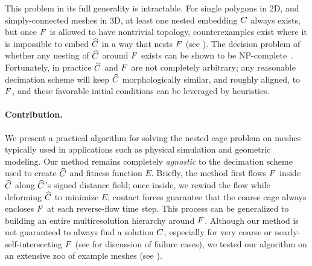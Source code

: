 This problem in its full generality is intractable. For
single polygons in 2D, and simply-connected meshes in 3D, at least one nested
embedding $C$ always exists, but once $F$ is allowed to have nontrivial
topology, counterexamples exist where it is impossible to embed $\widehat{C}$ in a way
that nests $F$ (see ). The decision
problem of whether any nesting of $\widehat{C}$ around $F$ exists can be 
shown to be NP-complete~\cite{CagesNP}.
Fortunately, in practice $\widehat{C}$ and $F$ are not completely arbitrary; any
reasonable decimation scheme will keep $\widehat{C}$ morphologically similar, and
roughly aligned, to $F$, and these favorable initial conditions can be
leveraged by heuristics.

\paragraph{Contribution.} We present a practical algorithm for solving the
nested cage problem on meshes typically used in applications such as physical
simulation and geometric modeling. Our method 
remains completely \emph{agnostic} to the decimation scheme used to create
$\widehat{C}$ and fitness function $E$. Briefly, the method first flows $F$ inside $\widehat{C}$
along $\widehat{C}$'s signed distance field; once inside, we rewind the flow while
deforming $\widehat{C}$ to minimize $E$; contact forces guarantee that the coarse cage
always encloses $F$ at each reverse-flow time step. This process can be
generalized to building an entire multiresolution hierarchy around $F$.
Although our method is not guaranteed to always find a solution $C$,
especially for very coarse or nearly-self-intersecting $F$ (see
for discussion of failure cases), we tested our algorithm on an extensive zoo
of example meshes (see ).

